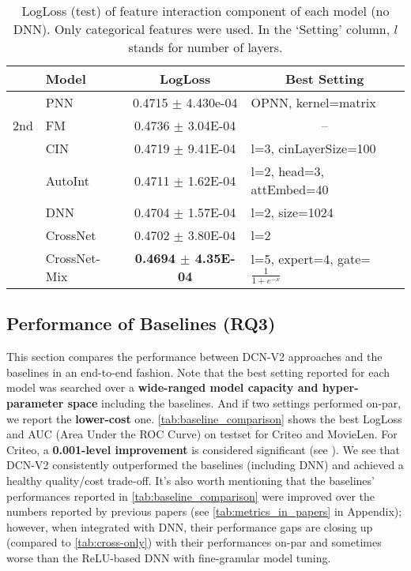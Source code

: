 \documentclass[sigconf]{acmart}
\begin{document}
\begin{table}[htpb]
\small
\caption{LogLoss (test) of feature interaction component of each model (no DNN). Only categorical features were used. In the `Setting' column, $l$ stands for number of layers.}
\vspace{-2ex}
\label{tab:cross-only}
\begin{center}
\begin{tabular}{c|l|cl}
\toprule
& Model & LogLoss & \multicolumn{1}{c}{Best Setting}\\
\midrule
\multirow{ 3}{*}{2nd} 
&PNN \cite{qu2016product} &0.4715 $\pm$ 4.430e-04 & OPNN, kernel=matrix\\
&FM      & 0.4736 $\pm$ 3.04E-04& \multicolumn{1}{c}{--} \\
\midrule
\multirow{ 5}{*}{$>$2} 
&CIN \cite{lian2018xdeepfm}  & 0.4719 $\pm$ 9.41E-04& l=3, cinLayerSize=100\\
&AutoInt \cite{song2019autoint}   & 0.4711 $\pm$ 1.62E-04& l=2, head=3, attEmbed=40\\
&DNN        & 0.4704 $\pm$ 1.57E-04& l=2, size=1024\\
\cline{2-4}
&CrossNet     & 0.4702 $\pm$ 3.80E-04& l=2\\
&CrossNet-Mix & \bf 0.4694 $\pm$ 4.35E-04 & l=5, expert=4, gate=$\frac{1}{1+e^{-x}}$\\

\bottomrule
\end{tabular}
\end{center}
\end{table}

\subsection{Performance of Baselines (RQ3)}
\label{sec:performance_baselines}
This section compares the performance between {DCN-V2} approaches and the baselines in an end-to-end fashion. Note that the best setting reported for each model was searched over a {\bf wide-ranged model capacity and hyper-parameter space} including the baselines. And if two settings performed on-par, we report the {\bf lower-cost} one. \autoref{tab:baseline_comparison} shows the best LogLoss and AUC (Area Under the ROC Curve) on testset for Criteo and MovieLen. For Criteo, a {\bf 0.001-level improvement} is considered significant (see \cite{song2019autoint, wang2017deep, guo2017deepfm}).  We see that {DCN-V2} consistently outperformed the baselines (including DNN) and achieved a healthy quality/cost trade-off. It's also worth mentioning that the baselines' performances reported in \autoref{tab:baseline_comparison} were improved over the numbers reported by previous papers (see \autoref{tab:metrics_in_papers} in Appendix); however, when integrated with DNN, their performance gaps are closing up (compared to \autoref{tab:cross-only}) with their performances on-par and sometimes worse than the ReLU-based DNN with fine-granular model tuning.
\end{document}
